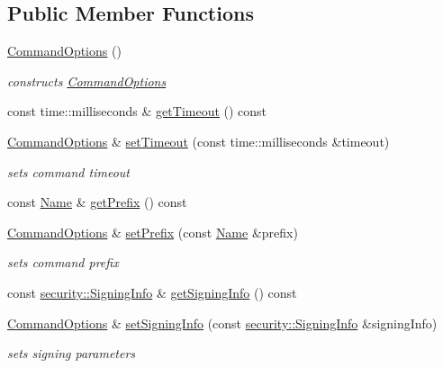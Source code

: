 \subsection*{Public Member Functions}
\begin{DoxyCompactItemize}
\item 
\hyperlink{classndn_1_1nfd_1_1CommandOptions_aa7753d9c97f36208ef0741458ccb87fa}{Command\+Options} ()
\begin{DoxyCompactList}\small\item\em constructs \hyperlink{classndn_1_1nfd_1_1CommandOptions}{Command\+Options} \end{DoxyCompactList}\item 
const time\+::milliseconds \& \hyperlink{classndn_1_1nfd_1_1CommandOptions_a4cf2fdc352eee9d2e8f0defb01341ba7}{get\+Timeout} () const
\item 
\hyperlink{classndn_1_1nfd_1_1CommandOptions}{Command\+Options} \& \hyperlink{classndn_1_1nfd_1_1CommandOptions_a31c56101663d79e00bdc612c4381c1af}{set\+Timeout} (const time\+::milliseconds \&timeout)
\begin{DoxyCompactList}\small\item\em sets command timeout \end{DoxyCompactList}\item 
const \hyperlink{classndn_1_1Name}{Name} \& \hyperlink{classndn_1_1nfd_1_1CommandOptions_a34e3ac8034371ebcc600999c9a8b5be2}{get\+Prefix} () const
\item 
\hyperlink{classndn_1_1nfd_1_1CommandOptions}{Command\+Options} \& \hyperlink{classndn_1_1nfd_1_1CommandOptions_a314f9c90f2b25b6276b6a117c047f590}{set\+Prefix} (const \hyperlink{classndn_1_1Name}{Name} \&prefix)
\begin{DoxyCompactList}\small\item\em sets command prefix \end{DoxyCompactList}\item 
const \hyperlink{classndn_1_1security_1_1SigningInfo}{security\+::\+Signing\+Info} \& \hyperlink{classndn_1_1nfd_1_1CommandOptions_a80ace7f3bed1f1586bdb3bd46d898f13}{get\+Signing\+Info} () const
\item 
\hyperlink{classndn_1_1nfd_1_1CommandOptions}{Command\+Options} \& \hyperlink{classndn_1_1nfd_1_1CommandOptions_ac79642243559a5a265d0d6e2feab1f4a}{set\+Signing\+Info} (const \hyperlink{classndn_1_1security_1_1SigningInfo}{security\+::\+Signing\+Info} \&signing\+Info)
\begin{DoxyCompactList}\small\item\em sets signing parameters \end{DoxyCompactList}\item 

\end{DoxyCompactItemize}
